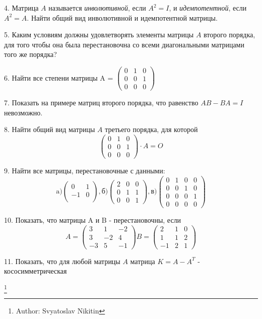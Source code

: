 \documentclass[12pt]{article}
\begin{document}
4. Матрица $A$ называется \emph{инволютивной}, если $A^2 = I$, и \emph{идемпотентной}, если $A^2 = A$. Найти общий вид инволютивной и идемпотентной матрицы.

5. Каким условиям должны удовлетворять элементы матрицы $A$ второго порядка, для того чтобы она была перестановочна со всеми диагональными матрицами того же порядка?

6. Найти все степени матрицы A = $\begin{pmatrix}
0 & 1 & 0\\
0 & 0 & 1\\
0 & 0 & 0
\end{pmatrix}$

7. Показать на примере матриц второго порядка, что равенство $AB - BA = I$ невозможно.

8. Найти общий вид матрицы $A$ третьего порядка, для которой
\[\begin{pmatrix}
0 & 1 & 0\\
0 & 0 & 1\\
0 & 0 & 0
\end{pmatrix} \cdot A = O
\]

9. Найти все матрицы, перестановочные с данными:
\[
\text{a)}\begin{pmatrix}
0 & 1\\
-1 & 0\\
\end{pmatrix},
\text{б)}\begin{pmatrix}
2 & 0 & 0\\
0 & 1 & 1\\
0 & 0 & 1
\end{pmatrix},
\text{в)}\begin{pmatrix}
0 & 1 & 0 & 0\\
0 & 0 & 1 & 0\\
0 & 0 & 0 & 1\\
0 & 0 & 0 & 0
\end{pmatrix}
\]

10. Показать, что матрицы A и B - перестановочны, если
\[
A = \begin{pmatrix}
3 & 1 & -2\\
3 & -2 & 4\\
-3 & 5 & -1
\end{pmatrix}
B = \begin{pmatrix}
2 & 1 & 0\\
1 & 1 & 2\\
-1 & 2 & 1
\end{pmatrix}
\]

11. Показать, что для любой матрицы $A$ матрица $ K = A - A^T$ - кососимметрическая

\renewcommand{\thefootnote}{ }
\footnote{Author: Svyatoslav Nikitin}
\end{document}
